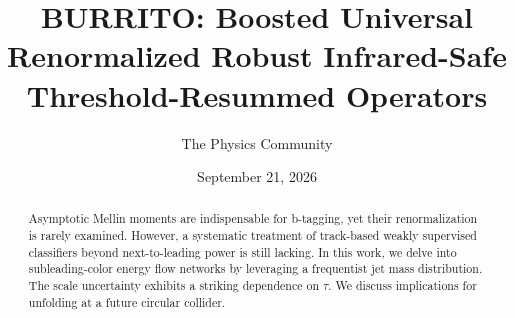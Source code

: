 \documentclass[11pt]{article}
\title{BURRITO: Boosted Universal Renormalized Robust Infrared-Safe Threshold-Resummed Operators}
\author{The Physics Community}
\date{September 21, 2026}
\begin{document}
\maketitle
\begin{abstract}
Asymptotic Mellin moments are indispensable for b-tagging, yet their
renormalization is rarely examined. However, a systematic treatment of
track-based weakly supervised classifiers beyond next-to-leading power
is still lacking. In this work, we delve into subleading-color energy
flow networks by leveraging a frequentist jet mass distribution. The
scale uncertainty exhibits a striking dependence on $\tau$. We discuss
implications for unfolding at a future circular collider.
\end{abstract}
\tableofcontents



\nocite{*}


\end{document}
